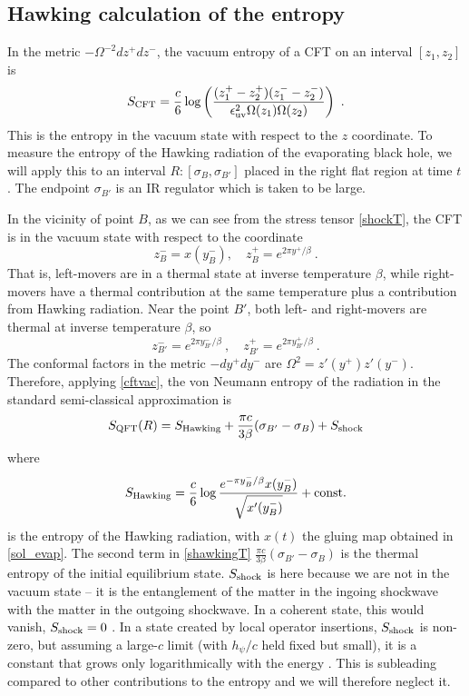 \documentclass[11pt,oneside,letterpaper]{article}
\newcommand{\be}{\begin{equation}}
\newcommand{\ee}{\end{equation}}
\def\be{\begin{eqnarray}}
\def\ee{\end{eqnarray}}
\def\be{\begin{equation}}
\def\ee{\end{equation}}
\numberwithin{equation}{section}
\def\be{\begin{equation}}
\def\ee{\end{equation}}
\def \be {\begin{equation}}
\def \ee {\end{equation}}
\newcommand{\Smatter}{S_{\rm QFT}}
\begin{document}
\begin{spacing}{1.1}
 \newcommand{\epsilonuv}{\epsilon_{\rm uv}}
\subsection{Hawking calculation of the entropy}
In the metric $-\Omega^{-2}dz^+ dz^-$, the vacuum entropy of a CFT on an interval $[z_1, z_2]$ is
\be\label{cftvac}
S_{\rm CFT} =  \frac{c}{6}\log \left( \frac{(z_1^+ - z_2^+)(z_1^- - z_2^-) }{\epsilonuv^2 \Omega(z_1)\Omega(z_2)} \right) \ .
\ee
This is the entropy in the vacuum state with respect to the $z$ coordinate. 
To measure the entropy of the Hawking radiation of the evaporating black hole, we will apply this to an interval $R: [\sigma_B, \sigma_{B'}]$ placed in the right flat region at time $t$. The endpoint $\sigma_{B'}$ is an IR regulator which is taken to be large.

In the vicinity of point $B$, as we can see from the stress tensor \eqref{shockT}, the CFT is in the vacuum state with respect to the coordinate
\be
z_B^- = x(y^-_B) , \quad z_B^+ = e^{2\pi y^+/\beta} \ .
\ee
That is, left-movers are in a thermal state at inverse temperature $\beta$, while right-movers have a thermal contribution at the same temperature plus a contribution from Hawking radiation. Near the point $B'$, both left- and right-movers are thermal at inverse temperature $\beta$, so
\be
z_{B'}^- = e^{2\pi y_{B'}^-/\beta} \ , \quad z_{B'}^+ = e^{2\pi y_{B'}^+/\beta} \ .
\ee
The conformal factors in the metric $-dy^+ dy^-$ are $\Omega^2 = z'%
(y^+)z'%
(y^-)$.
Therefore, applying \eqref{cftvac}, the von Neumann entropy of the radiation in the standard semi-classical approximation is
\be\label{shawkingT}
\Smatter(R) = S_{\rm Hawking}+ \frac{\pi c}{3\beta}(\sigma_{B'} - \sigma_B) + S_{\rm shock} 
\ee
where
\be\label{shawkingB}
S_{\rm Hawking} = \frac{c}{6} \log \frac{e^{-\pi y_B^-/\beta}x(y^-_B)}{\sqrt{x'(y^-_B)}}  + \mbox{const.}
\ee
is the entropy of the Hawking radiation, with $x(t)$ the gluing map obtained in \eqref{sol_evap}. The second term in \eqref{shawkingT} $\frac{\pi c}{3\beta}(\sigma_{B'} - \sigma_B)$ is the thermal entropy of the initial equilibrium state. $S_{\rm shock}$ is here because we are not in the vacuum state -- it is the entanglement of the matter in the ingoing shockwave with the matter in the outgoing shockwave. In a coherent state, this would vanish, $S_{\rm shock}=0$ \cite{Fiola:1994ir}. In a state created by local operator insertions, $S_{\rm shock}$ is non-zero, but assuming a large-$c$ limit (with $h_\psi/c$ held fixed but small), it is a constant that grows only logarithmically with the energy \cite{Asplund:2014coa,Caputa:2015waa}. This is subleading compared to other contributions to the entropy and we will therefore neglect it. 



\end{spacing}
\end{document}
